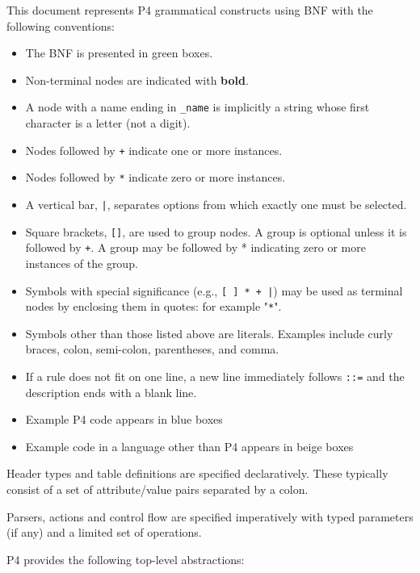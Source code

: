 \documentclass[12pt]{article}
\begin{document}
This document represents P4 grammatical constructs using BNF with the
following conventions:

\begin{itemize}
\item
The BNF is presented in green boxes.
\item
Non-terminal nodes are indicated with \textbf{bold}.
\item
A node with a name ending in \texttt{_name} is implicitly a string whose first character 
is a letter (not a digit).
\item
Nodes followed by \texttt{+} indicate one or more instances.
\item
Nodes followed by \texttt{*} indicate zero or more instances.
\item
A vertical bar, \texttt{|}, separates options from which exactly one must be selected.
\item
Square brackets, \texttt{[]}, are used to group nodes. A group is optional unless 
it is followed by \texttt{+}. A group may be followed by * indicating zero or more 
instances of the group.
\item
Symbols with special significance (e.g., \texttt{[ ] * + |}) may be used as terminal 
nodes by enclosing them in quotes: for example "\texttt{*}".
\item
Symbols other than those listed above are literals. Examples include curly 
braces, colon, semi-colon, parentheses, and comma.
\item
If a rule does not fit on one line, a new line immediately follows \texttt{::=} and 
the description ends with a blank line.
\item
Example P4 code appears in blue boxes
\item
Example code in a language other than P4 appears in beige boxes
\end{itemize}

Header types and table definitions are specified declaratively.  These
typically consist of a set of attribute/value pairs separated by a
colon.

Parsers, actions and control flow are specified imperatively with
typed parameters (if any) and a limited set of operations.



P4 provides the following top-level abstractions: 
\end{document}
